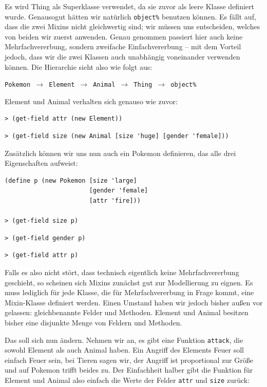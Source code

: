 Es wird Thing als Superklasse verwendet, da sie zuvor als leere Klasse definiert wurde. Genausogut hätten wir natürlich \texttt{object\%} benutzen können. Es fällt auf, dass die zwei Mixins nicht gleichwertig sind; wir müssen uns entscheiden, welches von beiden wir zuerst anwenden. Genau genommen passiert hier auch keine Mehrfachvererbung, sondern zweifache Einfachvererbung -- mit dem Vorteil jedoch, dass wir die zwei Klassen auch unabhängig voneinander verwenden können. Die Hierarchie sieht also wie folgt aus:

\texttt{Pokemon $\rightarrow$ Element $\rightarrow$ Animal $\rightarrow$ Thing $\rightarrow$ object\%}

Element und Animal verhalten sich genauso wie zuvor:

\begin{lstlisting}
> (get-field attr (new Element))
\end{lstlisting} 
{}

\begin{lstlisting}
> (get-field size (new Animal [size 'huge] [gender 'female]))
\end{lstlisting} 
{}

Zusätzlich können wir uns nun auch ein Pokemon definieren, das alle drei Eigenschaften aufweist:
\begin{lstlisting}
(define p (new Pokemon [size 'large]
                       [gender 'female]
                       [attr 'fire]))
 
> (get-field size p)
\end{lstlisting}
{}
\begin{lstlisting}
> (get-field gender p)
\end{lstlisting}
{}
\begin{lstlisting}
> (get-field attr p)
\end{lstlisting}
{}

Falls es also nicht stört, dass technisch eigentlich keine Mehrfachvererbung geschieht, so scheinen sich Mixins zunächst gut zur Modellierung zu eignen. Es muss lediglich für jede Klasse, die für Mehrfachvererbung in Frage kommt, eine Mixin-Klasse definiert werden. Einen Umstand haben wir jedoch bisher außen vor gelassen: gleichbenannte Felder und Methoden. Element und Animal besitzen bisher eine disjunkte Menge von Feldern und Methoden. 

Das soll sich nun ändern. Nehmen wir an, es gibt eine Funktion \texttt{attack}, die sowohl Element als auch Animal haben. Ein Angriff des Elements Feuer soll einfach Feuer sein, bei Tieren sagen wir, der Angriff ist proportional zur Größe und auf Pokemon trifft beides zu. Der Einfachheit halber gibt die Funktion für Element und Animal also einfach die Werte der Felder \texttt{attr} und \texttt{size} zurück:

